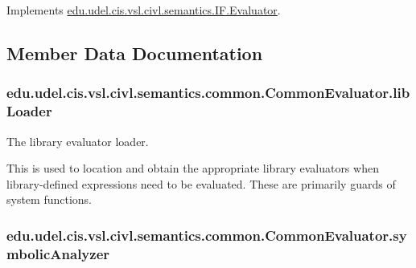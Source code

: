 Implements \hyperlink{interfaceedu_1_1udel_1_1cis_1_1vsl_1_1civl_1_1semantics_1_1IF_1_1Evaluator_a0a9ac7185a439c0eb14ee08d6d9d1694}{edu.\+udel.\+cis.\+vsl.\+civl.\+semantics.\+I\+F.\+Evaluator}.



\subsection{Member Data Documentation}
\hypertarget{classedu_1_1udel_1_1cis_1_1vsl_1_1civl_1_1semantics_1_1common_1_1CommonEvaluator_ac376c7581df851484bbcea00defabce3}{}
\subsubsection[{lib\+Loader}]{ edu.\+udel.\+cis.\+vsl.\+civl.\+semantics.\+common.\+Common\+Evaluator.\+lib\+Loader\hspace{0.3cm}{\ttfamily [protected]}}\label{classedu_1_1udel_1_1cis_1_1vsl_1_1civl_1_1semantics_1_1common_1_1CommonEvaluator_ac376c7581df851484bbcea00defabce3}


The library evaluator loader. 

This is used to location and obtain the appropriate library evaluators when library-\/defined expressions need to be evaluated. These are primarily guards of system functions. \hypertarget{classedu_1_1udel_1_1cis_1_1vsl_1_1civl_1_1semantics_1_1common_1_1CommonEvaluator_a714f874cf229bac7bf45da9f359c141e}{}
\subsubsection[{symbolic\+Analyzer}]{ edu.\+udel.\+cis.\+vsl.\+civl.\+semantics.\+common.\+Common\+Evaluator.\+symbolic\+Analyzer\hspace{0.3cm}{\ttfamily [protected]}}\label{classedu_1_1udel_1_1cis_1_1vsl_1_1civl_1_1semantics_1_1common_1_1CommonEvaluator_a714f874cf229bac7bf45da9f359c141e}



